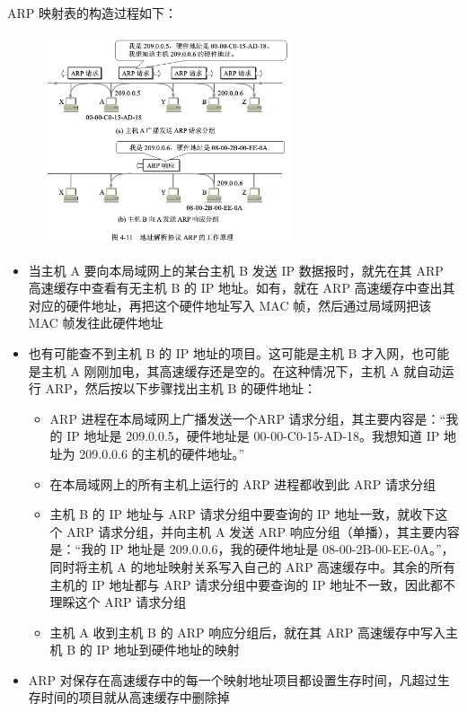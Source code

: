 \documentclass[cs4size,a4paper,10pt]{ctexart}
\begin{document}
	ARP 映射表的构造过程如下：
	\begin{figure}[H]
		\centering
		\includegraphics[width=0.65\textwidth]{img/4.11}
	\end{figure}
	\begin{itemize}
		\item 当主机 A 要向本局域网上的某台主机 B 发送 IP 数据报时，就先在其 ARP 高速缓存中查看有无主机 B 的 IP 地址。如有，就在 ARP 高速缓存中查出其对应的硬件地址，再把这个硬件地址写入 MAC 帧，然后通过局域网把该 MAC 帧发往此硬件地址
		\item 也有可能查不到主机 B 的 IP 地址的项目。这可能是主机 B 才入网，也可能是主机 A 刚刚加电，其高速缓存还是空的。在这种情况下，主机 A 就自动运行 ARP，然后按以下步骤找出主机 B 的硬件地址：
		\begin{itemize}
			\item ARP 进程在本局域网上广播发送一个ARP 请求分组，其主要内容是：“我的 IP 地址是 209.0.0.5，硬件地址是 00-00-C0-15-AD-18。我想知道 IP 地址为 209.0.0.6 的主机的硬件地址。”
			\item 在本局域网上的所有主机上运行的 ARP 进程都收到此 ARP 请求分组
			\item 主机 B 的 IP 地址与 ARP 请求分组中要查询的 IP 地址一致，就收下这个 ARP 请求分组，并向主机 A 发送 ARP 响应分组（单播），其主要内容是：“我的 IP 地址是 209.0.0.6，我的硬件地址是 08-00-2B-00-EE-0A。”，同时将主机 A 的地址映射关系写入自己的 ARP 高速缓存中。其余的所有主机的 IP 地址都与 ARP 请求分组中要查询的 IP 地址不一致，因此都不理睬这个 ARP 请求分组
			\item 主机 A 收到主机 B 的 ARP 响应分组后，就在其 ARP 高速缓存中写入主机 B 的 IP 地址到硬件地址的映射
		\end{itemize}
		\item ARP 对保存在高速缓存中的每一个映射地址项目都设置生存时间，凡超过生存时间的项目就从高速缓存中删除掉
	\end{itemize}
\end{document}

